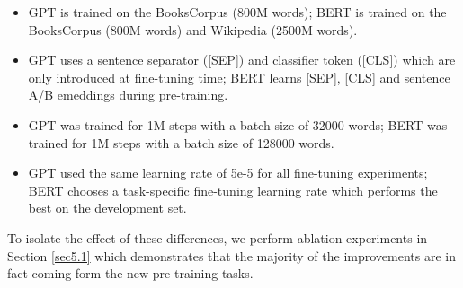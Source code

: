 		\begin{itemize}
			\item GPT is trained on the BooksCorpus (800M words); BERT is trained on the BooksCorpus (800M words) and Wikipedia (2500M words).
			\item GPT uses a sentence separator ([SEP]) and classifier token ([CLS]) which are only introduced at fine-tuning time; BERT learns [SEP], [CLS] and sentence A/B emeddings during pre-training.
			\item GPT was trained for 1M steps with a batch size of 32000 words; BERT was trained for 1M steps with a batch size of 128000 words.
			\item GPT used the same learning rate of 5e-5 for all fine-tuning experiments; BERT chooses a task-specific fine-tuning learning rate which performs the best on the development set.
		\end{itemize}
		
	To isolate the effect of these differences, we perform ablation experiments in Section \ref{sec5.1} which demonstrates that the majority of the improvements are in fact coming form the new pre-training tasks.
	
	
	
	
	